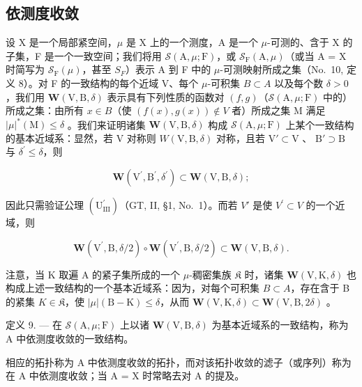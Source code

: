 \subsection{依测度收敛}

设 X 是一个局部紧空间，\(\mu\) 是 X 上的一个测度，A 是一个 \(\mu\)-可测的、含于 X 的子集，F 是一个一致空间；我们将用 \(\mathcal{S}(\mathrm{A},\mu;\mathrm{F})\)，或 \(\mathcal{S}_{\mathrm{F}}(\mathrm{A},\mu)\)（或当 A = X 时简写为 \(\mathcal{S}_{\mathrm{F}}(\mu)\)，甚至 \(S_{F}\)）表示 A 到 F 中的 \(\mu\)-可测映射所成之集（No.~10, 定义 8）。对 F 的一致结构的每个近域 V、每个 \(\mu\)-可积集 \(B \subset A\) 以及每个数 \(\delta > 0\)，我们用 \(\boldsymbol{W}(\mathrm{V},\mathrm{B},\delta)\) 表示具有下列性质的函数对 \((f,g)\)（\(\mathcal{S}(\mathrm{A},\mu;\mathrm{F})\) 中的）所成之集：由所有 \(x \in B\)（使 \((f(x),g(x)) \notin V\) 者）所成之集 M 满足 \(|\mu|^{*}(\mathrm{M}) \leqslant \delta\) 。我们来证明诸集 \(\boldsymbol{W}(\mathrm{V},\mathrm{B},\delta)\) 构成 \(\mathcal{S}(\mathrm{A},\mu ;\mathrm{F})\) 上某个一致结构的基本近域系：显然，若 V 对称则 \(W(\mathrm{V},\mathrm{B},\delta)\) 对称，且若 \(\mathrm{V}'\subset \mathrm{V}\) 、 \(\mathrm{B}'\supset \mathrm{B}\) 与 \(\delta^{\prime}\leqslant \delta\)，则

\[
\boldsymbol {W} \left(\mathrm{V} ^ {\prime}, \mathrm{B} ^ {\prime}, \delta^ {\prime}\right) \subset \boldsymbol {W} (\mathrm{V}, \mathrm{B}, \delta);
\]

因此只需验证公理 \((\mathrm{U}_{\mathrm{III}}^{\prime})\)（GT, II, §1, No.~1）。而若 \(V'\) 是使 \(V^{\prime} \subset V\) 的一个近域，则

\[
\boldsymbol {W} \left(\mathrm{V} ^ {\prime}, \mathrm{B}, \delta / 2\right) \circ \boldsymbol {W} \left(\mathrm{V} ^ {\prime}, \mathrm{B}, \delta / 2\right) \subset \boldsymbol {W} (\mathrm{V}, \mathrm{B}, \delta).
\]

注意，当 K 取遍 A 的紧子集所成的一个 \(\mu\)-稠密集族 \(\mathfrak{K}\) 时，诸集 \(\boldsymbol{W}(\mathrm{V},\mathrm{K},\delta)\) 也构成上述一致结构的一个基本近域系：因为，对每个可积集 \(B\subset A\)，存在含于 B 的紧集 \(K\in \mathfrak{K}\)，使 \(|\mu|(\mathrm{B}-\mathrm{K})\leqslant\delta\)，从而 \(\boldsymbol{W}(\mathrm{V},\mathrm{K},\delta)\subset\boldsymbol{W}(\mathrm{V},\mathrm{B},2\delta)\) 。

定义 9. --- 在 \(\mathcal{S}(\mathrm{A},\mu;\mathrm{F})\) 上以诸 \(\boldsymbol{W}(\mathrm{V},\mathrm{B},\delta)\) 为基本近域系的一致结构，称为 A 中依测度收敛的一致结构。

相应的拓扑称为 A 中依测度收敛的拓扑，而对该拓扑收敛的滤子（或序列）称为在 A 中依测度收敛；当 A = X 时常略去对 A 的提及。

